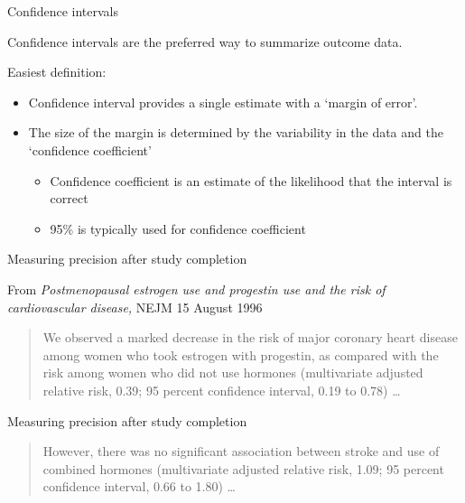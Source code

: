 \documentclass[ignorenonframetext,]{beamer}
\begin{document}
\begin{frame}{Confidence intervals}

Confidence intervals are the preferred way to summarize outcome data.
\medskip

Easiest definition:

\begin{itemize}
\item
  Confidence interval provides a single estimate with a `margin of
  error'.
\item
  The size of the margin is determined by the variability in the data
  and the `confidence coefficient'

  \begin{itemize}
  \item
    Confidence coefficient is an estimate of the likelihood that the
    interval is correct
  \item
    95\% is typically used for confidence coefficient
  \end{itemize}
\end{itemize}

\end{frame}

\begin{frame}{Measuring precision after study completion}

From
\textit{Postmenopausal estrogen use and progestin use and the risk of cardiovascular disease,}
NEJM 15 August 1996

\begin{quote}
We observed a marked decrease in the risk of major coronary heart disease among women who took estrogen with progestin, as compared with the risk among women who did not use hormones (multivariate adjusted relative risk, 0.39; 95 percent confidence interval, 0.19 to 0.78) \ldots

\end{quote}

\end{frame}

\begin{frame}{Measuring precision after study completion}

\begin{quote}
However, there was no significant association between stroke and use of combined hormones (multivariate adjusted relative risk, 1.09; 95 percent confidence interval, 0.66 to 1.80) \ldots

\end{quote}

\end{frame}
\end{document}
